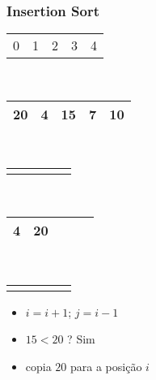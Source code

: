 \documentclass{beamer}
\begin{document}
\begin{frame}
    \frametitle{Insertion Sort}
    \begin{center}
        \begin{table}
            \begin{tabular}{p{0.25cm} p{0.25cm} p{0.25cm} p{0.25cm} p{0.25cm}}
                0 & 1 & 2 & 3 & 4
            \end{tabular} \\
            \begin{tabular}{| p{0.25cm} | p{0.25cm} | p{0.25cm} | p{0.25cm} | p{0.25cm} |}
                \hline
                20 & 4 & 15 & 7 & 10 \\ \hline
            \end{tabular} \\
            \begin{tabular}{p{0.25cm} p{0.25cm} p{0.25cm} p{0.25cm} p{0.25cm}}
                & & \color{green}{$\uparrow$} & &
            \end{tabular} \\
            \begin{tabular}{| p{0.25cm} | p{0.25cm} | p{0.25cm} | p{0.25cm} | p{0.25cm} |}
                \hline
                4 & 20 &  & & \\ \hline
            \end{tabular} \\
            \begin{tabular}{p{0.25cm} p{0.25cm} p{0.25cm} p{0.25cm} p{0.25cm}}
                & \color{red}{$\uparrow$}  & \color{blue}{$\uparrow$} & &
            \end{tabular}
        \end{table}
	\end{center}
    \color{green}{$ordenando = 15$}
    \begin{itemize}[<+->]
        \item $i = i + 1$; $j = i - 1$
        \item $15 < 20$ ? Sim
        \item copia $20$ para a posição $i$
    \end{itemize}
\end{frame}
\end{document}
